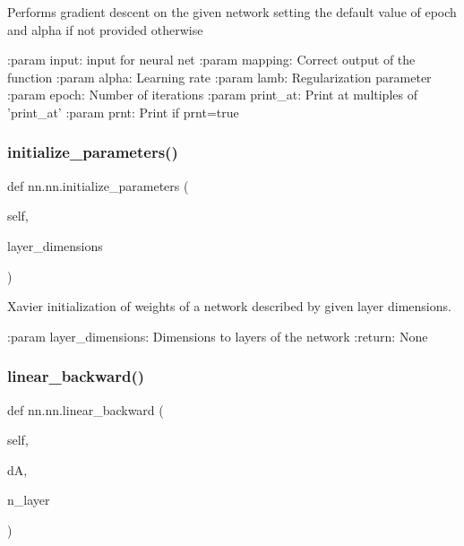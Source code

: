 \begin{DoxyVerb}Performs gradient descent on the given network setting the default value of epoch and alpha if not provided otherwise

:param input: input for neural net
:param mapping: Correct output of the function
:param alpha: Learning rate
:param lamb: Regularization parameter
:param epoch: Number of iterations
:param print_at: Print at multiples of 'print_at'
:param prnt: Print if prnt=true
\end{DoxyVerb}
 \mbox{\label{classnn_1_1nn_a9821fed1369b4d709fe297fe9e07d97b}} 
\subsubsection{\texorpdfstring{initialize\+\_\+parameters()}{initialize\_parameters()}}
{\footnotesize\ttfamily def nn.\+nn.\+initialize\+\_\+parameters (\begin{DoxyParamCaption}\item[{}]{self,  }\item[{}]{layer\+\_\+dimensions }\end{DoxyParamCaption})}

\begin{DoxyVerb}Xavier initialization of weights of a network described by given layer
dimensions.

:param layer_dimensions: Dimensions to layers of the network
:return: None
\end{DoxyVerb}
 \mbox{\label{classnn_1_1nn_a0863e90359fa30486c7161cd31c5b4e7}} 
\subsubsection{\texorpdfstring{linear\+\_\+backward()}{linear\_backward()}}
{\footnotesize\ttfamily def nn.\+nn.\+linear\+\_\+backward (\begin{DoxyParamCaption}\item[{}]{self,  }\item[{}]{dA,  }\item[{}]{n\+\_\+layer }\end{DoxyParamCaption})}

